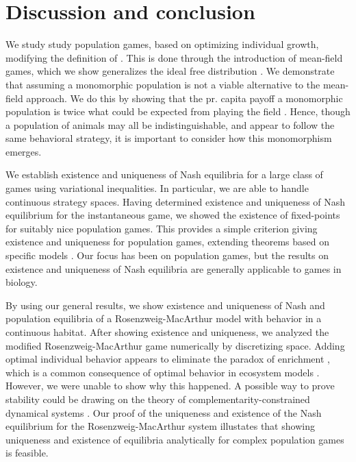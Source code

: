 \section{Discussion and conclusion}
We study study population games, based on optimizing individual growth, modifying the definition of \citep{vincent2005evolutionary}. This is done through the introduction of mean-field games, which we show generalizes the ideal free distribution \citep{fretwell1969territorial}. We demonstrate that assuming a monomorphic population is not a viable alternative to the mean-field approach. We do this by showing that the pr. capita payoff a monomorphic population is twice what could be expected from playing the field  \citep{parker1978searching} . Hence, though a population of animals may all be indistinguishable, and appear to follow the same behavioral strategy, it is important to consider how this monomorphism emerges.


We establish existence and uniqueness of Nash equilibria for a large class of games using variational inequalities. In particular, we are able to handle continuous strategy spaces. Having determined existence and uniqueness of Nash equilibrium for the instantaneous game, we showed the existence of fixed-points for suitably nice population games. This provides a simple criterion giving existence and uniqueness for population games, extending theorems based on specific models \citep{cressman2010ideal,sandholm2010population}. Our focus has been on population games, but the results on existence and uniqueness of Nash equilibria are generally applicable to games in biology.


By using our general results, we show existence and uniqueness of Nash and population equilibria of a Rosenzweig-MacArthur model with behavior in a continuous habitat. After showing existence and uniqueness, we analyzed the modified Rosenzweig-MacArthur game numerically by discretizing space. Adding optimal individual behavior appears to eliminate the paradox of enrichment \citep{rosenzweig1971paradox}, which is a common consequence of optimal behavior in ecosystem models \citep{abrams2010implications}. However, we were unable to show why this happened. A possible way to prove stability could be drawing on the theory of complementarity-constrained dynamical systems \citep{adly2018variational,brogliato2020dynamical}.
Our proof of the uniqueness and existence of the Nash equilibrium for the Rosenzweig-MacArthur system illustates that showing uniqueness and existence of equilibria analytically for complex population games \cite{pinti2019trophic} is feasible.


